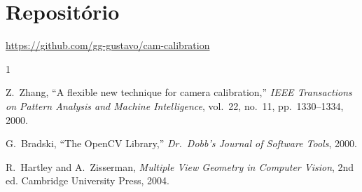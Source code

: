 \documentclass[conference]{IEEEtran}
\begin{document}
\section*{Repositório}

\url{https://github.com/gg-gustavo/cam-calibration}

\begin{thebibliography}{1}

Z.~Zhang, ``A flexible new technique for camera calibration,''
\emph{IEEE Transactions on Pattern Analysis and Machine Intelligence},
vol.~22, no.~11, pp.~1330--1334, 2000.

G.~Bradski, ``The OpenCV Library,'' \emph{Dr.\ Dobb's Journal of
Software Tools}, 2000.

R.~Hartley and A.~Zisserman, \emph{Multiple View Geometry in Computer
Vision}, 2nd ed. Cambridge University Press, 2004.

\end{thebibliography}
\end{document}

